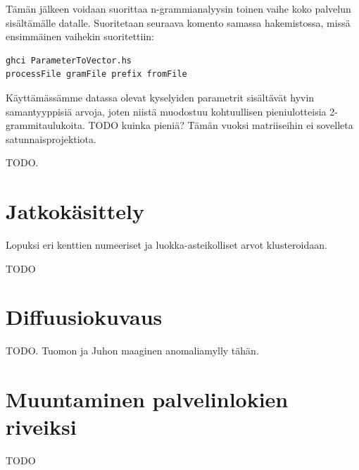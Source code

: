 Tämän jälkeen voidaan suorittaa n-grammianalyysin toinen vaihe koko
palvelun sisältämälle datalle. Suoritetaan seuraava komento samassa
hakemistossa, missä ensimmäinen vaihekin suoritettiin:

\begin{lstlisting}[language=bashshell]
ghci ParameterToVector.hs
processFile gramFile prefix fromFile
\end{lstlisting} 

Käyttämässämme datassa olevat kyselyiden parametrit sisältävät hyvin
samantyyppisiä arvoja, joten niistä muodostuu kohtuullisen
pieniulotteisia 2-grammitaulukoita. TODO kuinka pieniä? Tämän vuoksi
matriiseihin ei sovelleta satunnaisprojektiota.

TODO.

\section{Jatkokäsittely}

Lopuksi eri kenttien numeeriset ja
luokka-asteikolliset arvot klusteroidaan.

TODO

\section{Diffuusiokuvaus}

TODO. Tuomon ja Juhon maaginen anomaliamylly tähän.

\section{Muuntaminen palvelinlokien riveiksi}

TODO
